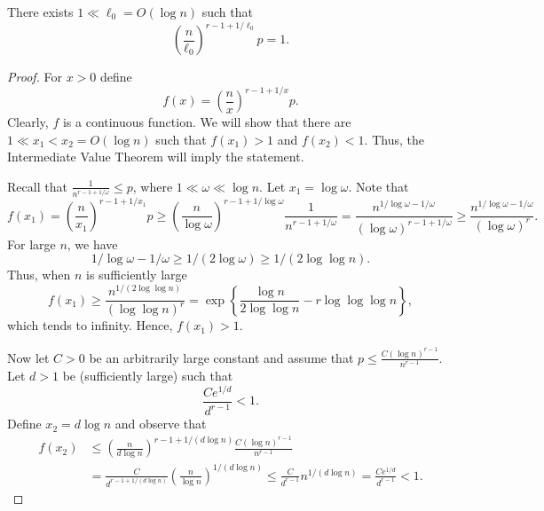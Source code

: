 \documentclass[10pt,a4paper]{amsart}
\begin{document}
\begin{claim}
There exists $1\ll \ell_0 = O(\log n)$ such that 
\[
\left(\frac{n}{\ell_0}\right)^{r-1+1/\ell_0} p =1.
\] 
\end{claim}

\begin{proof}
For $x>0$ define
\[
f(x) = \left(\frac{n}{x}\right)^{r-1+1/x} p.
\]
Clearly, $f$ is a continuous function. We will show that there are $1\ll x_1 < x_2 = O(\log n)$ such that $f(x_1)>1$ and $f(x_2)<1$. Thus,  the Intermediate Value Theorem will imply the statement.

Recall that $\frac{1}{n^{r-1+1/\omega}} \le p$, where $1\ll \omega \ll \log n$. Let $x_1=\log \omega$. Note that
\[
f(x_1) = \left(\frac{n}{x_1}\right)^{r-1+1/x_1} p
\ge \left(\frac{n}{\log \omega}\right)^{r-1+1/\log \omega} \frac{1}{n^{r-1+1/\omega}}
= \frac{n^{1/\log \omega - 1/\omega}}{(\log \omega)^{r-1+1/\omega}}
\ge \frac{n^{1/\log \omega - 1/\omega}}{(\log \omega)^{r}}.
\]
For large $n$, we have 
\[
1/\log \omega - 1/\omega \ge 1/(2\log \omega) \ge 1/(2\log \log n).
\]
Thus, when $n$ is sufficiently large
\[
f(x_1) \ge \frac{n^{1/(2\log \log n)}}{(\log \log n)^{r}}
= \exp\left\{ \frac{\log n}{2\log \log n} - r\log \log \log n \right\},
\]
which tends to infinity. Hence, $f(x_1) > 1$.

Now let $C>0$ be an arbitrarily large constant and assume that $p\le \frac{C(\log n)^{r-1}}{n^{r-1}}$. Let $d>1$ be (sufficiently large) such that 
\[
\frac{Ce^{1/d}}{d^{r-1}}   < 1.
\]
Define $x_2 = d \log n$ and observe that
\begin{align*}
f(x_2) &\le \left(\frac{n}{d\log n}\right)^{r-1+1/(d\log n)} \frac{C(\log n)^{r-1}}{n^{r-1}}\\
&= \frac{C}{d^{r-1+1/(d\log n)}} \left(\frac{n}{\log n}\right)^{1/(d\log n)} 
\le \frac{C}{d^{r-1}} n^{1/(d\log n)} = \frac{Ce^{1/d}}{d^{r-1}}   < 1.
\end{align*}
\end{proof}
\end{document}
